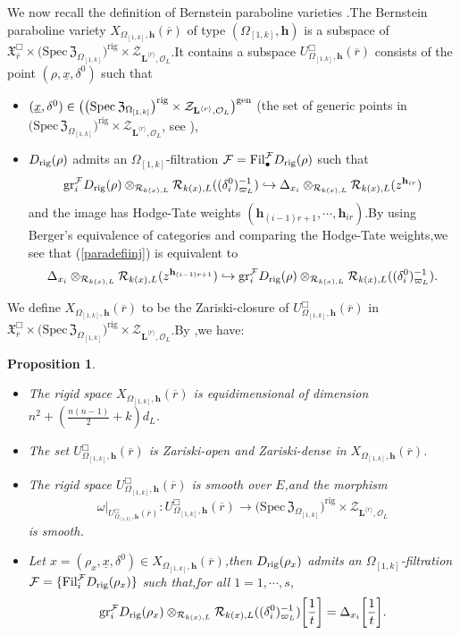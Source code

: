 \documentclass[SecEq,CM,GP]{degruyter-crelle} %
\theoremstyle{plain}
\newtheorem{pro}[thm]{Proposition}
\newcommand{\defvar}{{ X_{\omepik,\mathbf{{h}}}(\overline{r})}}
\newcommand{\fil}{{\rm Fil}}
\newcommand{\gen}{{\rm gen}}
\newcommand{\gr}{{\rm gr}}
\newcommand{\lrr}{{\langle r\rangle}}
\newcommand{\omepik}{\Omega_{[1,k]}}
\newcommand{\rig}{{\rm rig}}
\newcommand{\rigch}{{\mathcal{Z}_{\bL^{\lrr},\mathcal{O}_L}}}
\newcommand{\sbanpik}{{\big(\mathrm{Spec}\hspace{2pt}\mathfrak{Z}_{\omepik}\big)^{\mathrm{rig}}}}
\newcommand{\undelram}{{\delta^0}}
\newcommand{\bL}{{\mathbf{L}}}
\newcommand{\bh}{{\mathbf{h}}}
\newcommand{\cR}{\mathcal R}
\newcommand{\cF}{\mathcal F}
\begin{document}
We now recall the definition of Bernstein paraboline varieties \cite[Section 4.2]{Ding2021}.\;The Bernstein paraboline variety $\defvar$ of type {$(\omepik,\bh)$} is a subspace of $\mathfrak{X}_{\overline{r}}^\Box\times \sbanpik\times\rigch$.\;It contains a subspace $U^\Box_{\omepik,\mathbf{{h}}}(\overline{r})$  consists of the point $(\rho,\underline{x},\undelram)$ such that
\begin{itemize}\label{dfnvardef}
\item[(1)] $(\underline{x},\undelram)\in \big(\sbanpik\times\rigch\big)^{\gen}$ (the set of generic points in $\sbanpik\times\rigch$, see \cite[Section 4.2]{Ding2021}),
\item[(2)] $D_{\rig}(\rho)$ admits an $\omepik$-filtration $\cF=\fil_{\bullet}^{\cF} D_{\rig}(\rho)$ such that
\begin{equation}\label{paradefiinj}
	\begin{aligned}
		\gr_i^{\cF}D_{\rig}(\rho)\otimes_{\cR_{k(x),L}}\cR_{k(x),L}((\delta_i^0)^{-1}_{\varpi_L})\hookrightarrow \Delta_{x_i}\otimes_{\cR_{k(x),L}}\cR_{k(x),L}(z^{\bh_{ir}})
	\end{aligned}
\end{equation}
and the image has Hodge-Tate weights $(\bh_{(i-1)r+1},\cdots,\bh_{ir})$.\;By using Berger's equivalence of categories \cite[Theorem  A]{berger2008equations} and comparing the Hodge-Tate weights,\;we see that (\ref{paradefiinj}) is equivalent to 
\begin{equation}\label{dfnvardef1}
	\Delta_{x_i}\otimes_{\cR_{k(x),L}}\cR_{k(x),L}(z^{\bh_{(i-1)r+1}})  \hookrightarrow\gr_i^{\cF}D_{\rig}(\rho)\otimes_{\cR_{k(x),L}}\cR_{k(x),L}((\delta_i^0)^{-1}_{\varpi_L}).
\end{equation}
\end{itemize}
We define $\defvar$ to be the Zariski-closure of $U^\Box_{\omepik,\mathbf{{h}}}(\overline{r})$ in $\mathfrak{X}_{\overline{r}}^\Box\times \sbanpik\times\rigch$.\;By \cite[Theorem.5,\;Corollary.5]{Ding2021},\;we have:
\begin{pro}\label{propertyparavar}\hspace{20pt}
\begin{itemize}
	\item[(1)] The rigid space $\defvar$ is equidimensional of dimension $n^2+\left(\frac{n(n-1)}{2}+k\right)d_L$.\;
	\item[(2)] The set $U^\Box_{\omepik,\mathbf{{h}}}(\overline{r})$ is Zariski-open and  Zariski-dense in $\defvar$.
	\item[(3)] The rigid space  $U^\Box_{\omepik,\mathbf{{h}}}(\overline{r})$ is smooth over $E$,\;and the morphism $${\omega}|_{U^\Box_{\omepik,\mathbf{{h}}}(\overline{r})}:U^\Box_{\omepik,\mathbf{{h}}}(\overline{r})\rightarrow \sbanpik\times\rigch$$ is smooth.\;
	\item[(4)] Let $x=(\rho_x,\underline{x},\undelram)\in \defvar$,\;then $D_{\rig}(\rho_x)$ admits an $\omepik$-filtration $\cF=\{\fil_i^\cF D_{\rig}(\rho_x)\}$ such that,\;for all $1=1,\cdots,s$,\;
	\[\gr_{i}^{\cF}D_{\rig}(\rho_x)\otimes_{\cR_{k(x),L}}\cR_{k(x),L}((\delta_i^0)^{-1}_{\varpi_L})\bigg[\frac{1}{t}\bigg]=\Delta_{x_i}\bigg[\frac{1}{t}\bigg].\]
\end{itemize}
\end{pro}
\end{document}
